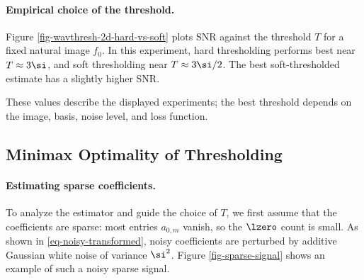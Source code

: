                                        
                                                                                                                                                                               


  
\paragraph{Empirical choice of the threshold.}

Figure \ref{fig-wavthresh-2d-hard-vs-soft} plots SNR against the threshold $T$ for a fixed natural image $f_0$. In this experiment, hard thresholding performs best near $T \approx 3\si$, and soft thresholding near $T\approx 3\si/2$. The best soft-thresholded estimate has a slightly higher SNR.


These values describe the displayed experiments; the best threshold depends on the image, basis, noise level, and loss function.


                                                     
\subsection{Minimax Optimality of Thresholding}
\label{subsec-minimax-denoise}

  
\paragraph{Estimating sparse coefficients.}

To analyze the estimator and guide the choice of $T$, we first assume that the coefficients
are sparse: most entries $a_{0,m}$ vanish, so the $\lzero$ count
is small. 
As shown in \eqref{eq-noisy-transformed}, noisy coefficients 
are perturbed by additive Gaussian white noise of variance $\si^2$. Figure \ref{fig-sparse-signal} shows an example of such a noisy sparse signal.



